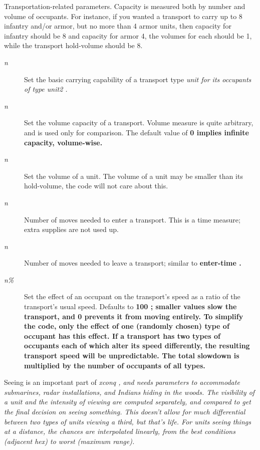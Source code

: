 Transportation-related parameters.  Capacity is measured both by number
and volume of occupants.  For instance, if you wanted a transport to carry
up to 8 infantry and/or armor, but no more than 4 armor units, then capacity
for infantry should be 8 and capacity for armor 4, the volumes for each 
should be 1, while the transport hold-volume should be 8.
\begin{description}
\item[{%
\it n}]
Set the basic carrying capability of a transport type %
\it unit \rm%
for its occupants of type %
\it unit2\rm%
.
\item[{%
\it n}]
Set the volume capacity of a transport.  Volume measure is quite arbitrary,
and is used only
for comparison.
The default value of %
\bf 0 \rm%
implies infinite capacity, volume-wise.
\item[{%
\it n}]
Set the volume of a unit.  The volume of a unit may be smaller than its
hold-volume, the code will not care about this.
\item[{%
\it n}]
Number of moves needed to enter a transport.  This is a time measure;
extra supplies are not used up.
\item[{%
\it n}]
Number of moves needed to leave a transport; similar to %
\bf enter-time\rm%
.
\item[{%
\it n\%}]
Set the effect of an occupant on the transport's speed as a ratio of the
transport's usual speed.  Defaults to %
\bf 100\rm%
;  smaller values slow the
transport, and %
\bf 0 \rm%
prevents it from moving entirely.  To simplify the code,
only the effect of one (randomly chosen) type of occupant has this effect.
If a transport has two types of
occupants each of which alter its speed differently, the resulting transport
speed will be unpredictable.
The total slowdown is multiplied by the number of occupants of all types.
\end{description}\par\noindent
Seeing is an important part of %
\it xconq\rm%
, and needs parameters to accommodate
submarines, radar installations, and Indians hiding in the woods.
The visibility of a unit and the intensity of viewing are computed separately,
and compared to get the final decision on seeing something.  This doesn't
allow for much differential between two types of units viewing a third,
but that's life.  For units seeing things at a distance, the chances are
interpolated linearly, from the best conditions (adjacent hex) to worst
(maximum range).

